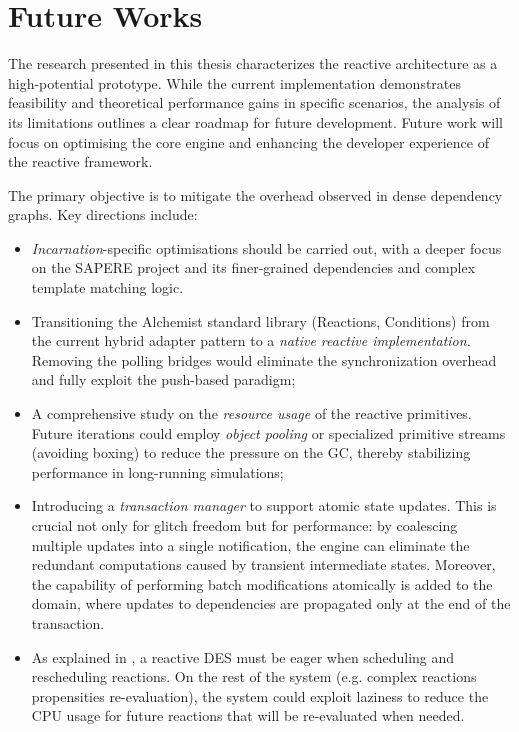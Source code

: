 \section{Future Works}
The research presented in this thesis characterizes the reactive architecture
as a high-potential prototype. While the current implementation demonstrates
feasibility and theoretical performance gains in specific scenarios, the
analysis of its limitations outlines a clear roadmap for future development.
Future work will focus on optimising the core engine and enhancing the
developer experience of the reactive framework.

The primary objective is to mitigate the overhead observed in dense dependency
graphs. Key directions include:
\begin{itemize}
	\item \emph{Incarnation}-specific optimisations should be carried out, with
	      a deeper focus on the SAPERE project and its finer-grained dependencies
	      and complex template matching logic.
	\item Transitioning the Alchemist standard library (Reactions, Conditions)
	      from the current hybrid adapter pattern to a \emph{native reactive
		      implementation}. Removing the polling bridges would eliminate the
	      synchronization overhead and fully exploit the push-based paradigm;
	\item A comprehensive study on the \emph{resource usage} of the reactive
	      primitives. Future iterations could employ \emph{object pooling} or
	      specialized primitive streams (avoiding boxing) to reduce the pressure
	      on the \ac{GC}, thereby stabilizing performance in long-running
	      simulations;
	\item Introducing a \emph{transaction manager} to support atomic state
	      updates. This is crucial not only for glitch freedom but for
	      performance: by coalescing multiple updates into a single notification,
	      the engine can eliminate the redundant computations caused by transient
	      intermediate states. Moreover, the capability of performing batch
	      modifications atomically is added to the domain, where updates to
	      dependencies are propagated only at the end of the transaction.
	\item As explained in , a reactive \ac{DES} must be
	      eager when scheduling and rescheduling reactions. On the rest of the
	      system (e.g. complex reactions propensities re-evaluation), the
	      system could exploit laziness to reduce the CPU usage for future
	      reactions that will be re-evaluated when needed.
\end{itemize}

